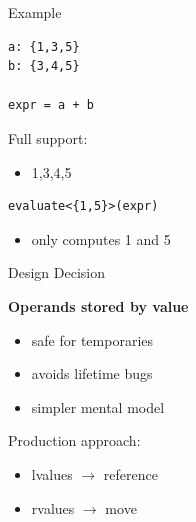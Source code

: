 \documentclass{beamer}
\begin{document}

\begin{frame}[fragile]{Example}

\begin{lstlisting}
a: {1,3,5}
b: {3,4,5}

expr = a + b
\end{lstlisting}

\vspace{1em}

Full support:

\begin{itemize}
\item {1,3,4,5}
\end{itemize}

\vspace{1em}

\begin{lstlisting}
evaluate<{1,5}>(expr)
\end{lstlisting}

\begin{itemize}
\item only computes 1 and 5
\end{itemize}

\end{frame}


\begin{frame}{Design Decision}

\textbf{Operands stored by value}

\vspace{1em}

\begin{itemize}
\item safe for temporaries
\item avoids lifetime bugs
\item simpler mental model
\end{itemize}

\vspace{1em}

Production approach:

\begin{itemize}
\item lvalues $\rightarrow$ reference
\item rvalues $\rightarrow$ move
\end{itemize}

\end{frame}
\end{document}
